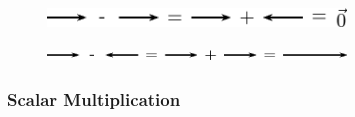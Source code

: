     \setcounter{subfigure}{0}


	\begin{figure}[H] %
    \begin{center}
    \label{m38813*id189182!!!underscore!!!media}\label{m38813*id189182!!!underscore!!!printimage}\includegraphics[width=300px]{col11305.imgs/m38813_PG11C1_037.png} %
        
      \vspace{2pt}
    \vspace{.1in}
    
    \end{center}

 \end{figure}   

    \addtocounter{footnote}{-0}
    
        \par 
        \label{m38813*id189188}
          
    \setcounter{subfigure}{0}


	\begin{figure}[H] %
    \begin{center}
    \label{m38813*id189192!!!underscore!!!media}\label{m38813*id189192!!!underscore!!!printimage}\includegraphics[width=300px]{col11305.imgs/m38813_PG11C1_038.png} %
        
      \vspace{2pt}
    \vspace{.1in}
    
    \end{center}

 \end{figure}   

    \addtocounter{footnote}{-0}
    
        \par 
      
      \label{m38813*uid37}
            \subsubsection{ Scalar Multiplication}
            \nopagebreak
            
